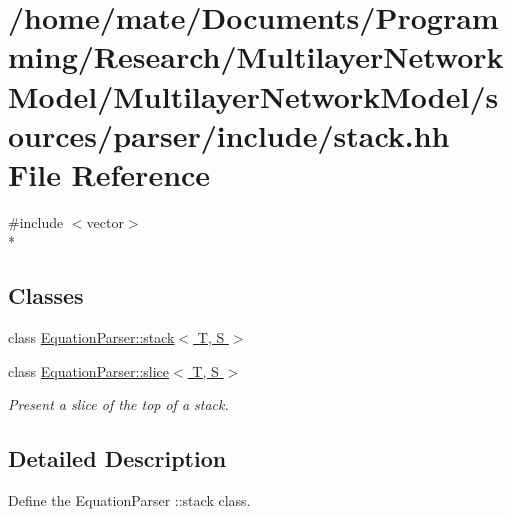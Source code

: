 \hypertarget{stack_8hh}{}\section{/home/mate/\+Documents/\+Programming/\+Research/\+Multilayer\+Network\+Model/\+Multilayer\+Network\+Model/sources/parser/include/stack.hh File Reference}
\label{stack_8hh}
{\ttfamily \#include $<$vector$>$}\\*
\subsection*{Classes}
\begin{DoxyCompactItemize}
\item 
class \hyperlink{classEquationParser_1_1stack}{Equation\+Parser\+::stack$<$ T, S $>$}
\item 
class \hyperlink{classEquationParser_1_1slice}{Equation\+Parser\+::slice$<$ T, S $>$}
\begin{DoxyCompactList}\small\item\em Present a slice of the top of a stack. \end{DoxyCompactList}\end{DoxyCompactItemize}


\subsection{Detailed Description}
Define the Equation\+Parser \+::stack class. 